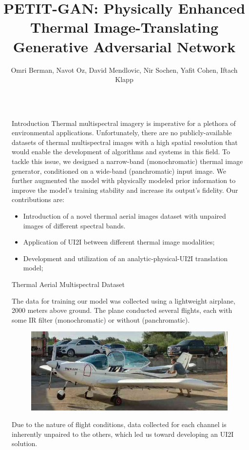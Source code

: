 \documentclass[final]{beamer}
\title{PETIT-GAN: Physically Enhanced Thermal Image-Translating Generative Adversarial Network}
\author{Omri Berman, Navot Oz, David Mendlovic, Nir Sochen, Yafit Cohen, Iftach Klapp}
\institute[shortinst]{Tel Aviv University, Tel Aviv, Israel \\Agricultural Research Organization - Volcani Institute, Rishon LeZion, Israel}
\newlength{\sepwidth}
\newlength{\colwidth}
\newcommand{\separatorcolumn}{\begin{column}{\sepwidth}\end{column}}
\begin{document}
\begin{frame}[t]
\begin{columns}[t]
\separatorcolumn


\begin{column}{\colwidth}

  \begin{block}{Introduction}
    Thermal multispectral imagery is imperative for a plethora of environmental applications.
    Unfortunately, there are no publicly-available datasets of thermal multispectral images with a high spatial resolution that would enable the development of algorithms and systems in this field.    
    To tackle this issue, we designed a narrow-band (monochromatic) thermal image generator, conditioned on a wide-band (panchromatic) input image.
    We further augmented the model with physically modeled prior information to improve the model's training stability and increase its output's fidelity.
    Our contributions are:
    \begin{itemize}
      \item Introduction of a novel thermal aerial images dataset with unpaired images of different spectral bands.
      \item Application of UI2I between different thermal image modalities;
      \item Development and utilization of an analytic-physical-UI2I translation model;
    \end{itemize}                
  \end{block}

  \begin{block}{Thermal Aerial Multispectral Dataset}

    The data for training our model was collected using a lightweight airplane, 2000 meters above ground.
    The plane conducted several flights, each with some IR filter (monochromatic) or without (panchromatic).
    \begin{figure}
      \centering
      \includegraphics[width=\textwidth]{../figs/data/light_airplane.jpeg}
    \end{figure}
    Due to the nature of flight conditions, data collected for each channel is inherently unpaired to the others, which led us toward developing an UI2I solution.    
  \end{block}


\end{column}
\end{columns}
\end{frame}
\end{document}

